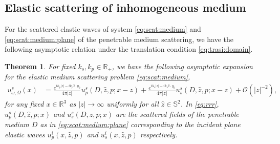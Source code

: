 \documentclass[a4paper,11pt]{article}
\newtheorem{theorem}{Theorem}[section]
\theoremstyle{remark}
\theoremstyle{definition}
\numberwithin{equation}{section}
\begin{document}

\subsection{Elastic scattering of inhomogeneous medium}


For the scattered elastic waves of system \eqref{eq:scat:medium} and \eqref{eq:scat:medium:plane} of the penetrable medium scattering, we have the following asymptotic relation under the translation condition \eqref{eq:trasi:domain}.
  \begin{theorem}\label{thm:medium}
For fixed $k_s, k_p \in \mathbb{R}_{+}$, we have the following asymptotic expansion for the elastic medium scattering problem \eqref{eq:scat:medium},
  \begin{align}\label{eq:rrr}
 u_{\omega,\Omega}^s(x) & = \frac{e^{ik_p|z|-ik_p\hat{z} \cdot y_0}}{4 \pi |z|}u_{p}^s(D,\hat{z},p;x-z) + \frac{e^{ik_s|z|-ik_s\hat{z} \cdot y_0}}{4 \pi |z|}u_{s}^s(D,\hat{z},p;x-z)+ \mathcal{O}(|z|^{-2}),
 \end{align}
 for any fixed $x \in \mathbb{R}^3$ as $|z| \rightarrow \infty$ uniformly for all $\hat{z} \in \mathbb{S}^2$. In \eqref{eq:rrr}, $u_{p}^s(D,\hat{z},p;x)$ and $u_{s}^s(D,\hat{z},p;x)$ are the scattered fields of the penetrable medium $D$ as in \eqref{eq:scat:medium:plane} corresponding to the incident plane
 elastic waves
  $u_{p}^i(x, \hat{z}, p)$ and $u_{s}^i(x, \hat{z},p)$ respectively.
 \end{theorem}
\end{document}

